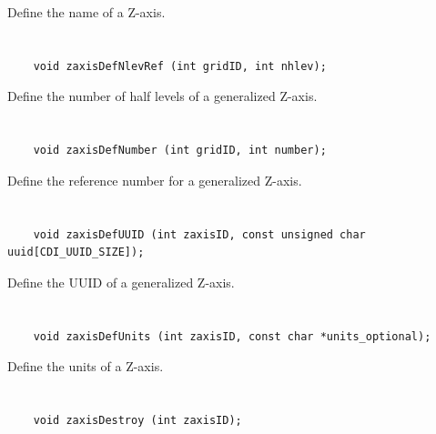 Define the name of a Z-axis.


\section*{\tt {}}

\begin{verbatim}
    void zaxisDefNlevRef (int gridID, int nhlev);
\end{verbatim}

Define the number of half levels of a generalized Z-axis.


\section*{\tt {}}

\begin{verbatim}
    void zaxisDefNumber (int gridID, int number);
\end{verbatim}

Define the reference number for a generalized Z-axis.


\section*{\tt {}}

\begin{verbatim}
    void zaxisDefUUID (int zaxisID, const unsigned char uuid[CDI_UUID_SIZE]);
\end{verbatim}

Define the UUID of a generalized Z-axis.


\section*{\tt {}}

\begin{verbatim}
    void zaxisDefUnits (int zaxisID, const char *units_optional);
\end{verbatim}

Define the units of a Z-axis.


\section*{\tt {}}

\begin{verbatim}
    void zaxisDestroy (int zaxisID);
\end{verbatim}

